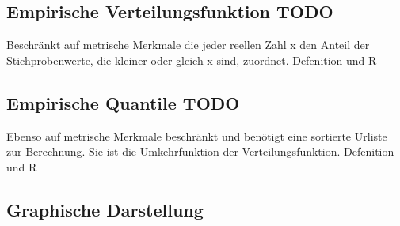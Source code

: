 \documentclass[a4paper,10pt]{scrartcl}
\begin{document}
\subsection{Empirische Verteilungsfunktion TODO}
Beschränkt auf metrische Merkmale die jeder reellen Zahl x den Anteil der Stichprobenwerte, die kleiner oder gleich x sind, zuordnet.
Defenition und R
\subsection{Empirische Quantile TODO}
Ebenso auf metrische Merkmale beschränkt und benötigt eine sortierte Urliste zur Berechnung. Sie ist die Umkehrfunktion der Verteilungsfunktion.
Defenition und R

\subsection{Graphische Darstellung}
\end{document}
